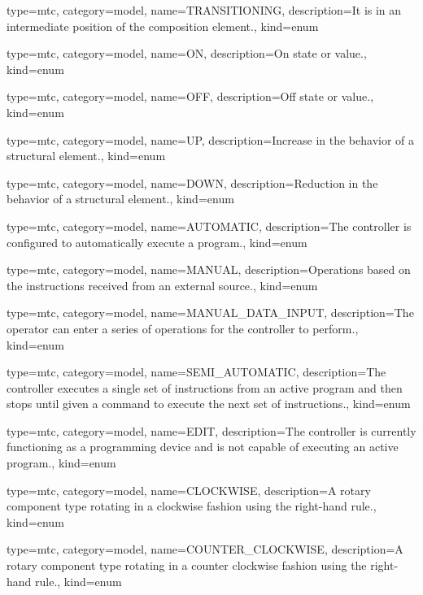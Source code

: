 {
  type=mtc,
  category=model,
  name={TRANSITIONING},
  description={It is in an intermediate position of the \gls{composition} element.},
  kind={enum}
}


{
  type=mtc,
  category=model,
  name={ON},
  description={On state or value.},
  kind={enum}
}


{
  type=mtc,
  category=model,
  name={OFF},
  description={Off state or value.},
  kind={enum}
}


{
  type=mtc,
  category=model,
  name={UP},
  description={Increase in the behavior of a \gls{structural element}.},
  kind={enum}
}


{
  type=mtc,
  category=model,
  name={DOWN},
  description={Reduction in the behavior of a \gls{structural element}.},
  kind={enum}
}


{
  type=mtc,
  category=model,
  name={AUTOMATIC},
  description={The \gls{controller} is configured to automatically execute a program.},
  kind={enum}
}


{
  type=mtc,
  category=model,
  name={MANUAL},
  description={Operations based on the instructions received from an external source.},
  kind={enum}
}


{
  type=mtc,
  category=model,
  name={MANUAL\_DATA\_INPUT},
  description={The operator can enter a series of operations for the controller to perform.},
  kind={enum}
}


{
  type=mtc,
  category=model,
  name={SEMI\_AUTOMATIC},
  description={The controller  executes a single set of instructions from an active program and then stops until given a command to execute the next set of instructions.},
  kind={enum}
}


{
  type=mtc,
  category=model,
  name={EDIT},
  description={The controller is currently functioning as a programming device and is not capable of executing an active program.},
  kind={enum}
}


{
  type=mtc,
  category=model,
  name={CLOCKWISE},
  description={A \gls{rotary} component type rotating in a clockwise fashion using the right-hand rule.},
  kind={enum}
}


{
  type=mtc,
  category=model,
  name={COUNTER\_CLOCKWISE},
  description={A \gls{rotary} component type rotating in a counter clockwise fashion using the right-hand rule.},
  kind={enum}
}


